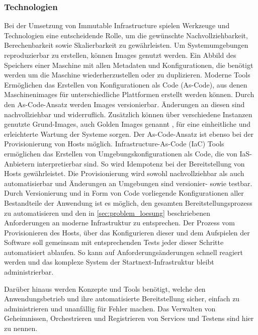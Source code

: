 \documentclass[11pt]{scrartcl}
\begin{document}
\subsubsection{Technologien} 
Bei der Umsetzung von Immutable Infrastructure spielen Werkzeuge und Technologien eine entscheidende Rolle, um die gewünschte Nachvollziehbarkeit, Berechenbarkeit sowie Skalierbarkeit zu gewährleisten. \newline 
Um Systemumgebungen reproduzierbar zu erstellen, können Images genutzt werden. Ein Abbild des Speichers einer Maschine mit allen Metadaten und Konfigurationen, die benötigt werden um die Maschine wiederherzustellen oder zu duplizieren. Moderne Tools Ermöglichen das Erstellen von Konfigurationen als Code (As-Code), aus denen Maschinenimages für unterschiedliche Plattformen erstellt werden können. Durch den \glqq As-Code\grqq{}-Ansatz werden Images versionierbar. Änderungen an diesen sind nachvollziehbar und widerruflich. Zusätzlich können über verschiedene Instanzen genutzte Grund-Images, auch Golden Images genannt \cite{GoldenImage:2018}, für eine einheitliche und erleichterte Wartung der Systeme sorgen. 
\newline
Der \glqq As-Code\grqq{}-Ansatz ist ebenso bei der Provisionierung von Hosts möglich. Infrastructure-As-Code (IaC) Tools ermöglichen das Erstellen von Umgebungskonfigurationen als Code, die von IaS-Anbietern interpretierbar sind. So wird Idempotenz bei der Bereitstellung von Hosts gewährleistet. Die Provisionierung wird sowohl nachvollziehbar als auch automatisierbar und Änderungen an Umgebungen sind versionier- sowie testbar.
Durch Versionierung und in Form von Code vorliegende Konfigurationen aller Bestandteile der Anwendung ist es möglich, den gesamten Bereitstellungsprozess zu automatisieren und den in \cref{sec:problem_loesung} beschriebenen Anforderungen an moderne Infrastruktur zu entsprechen. Der Prozess vom Provisionieren des Hosts, über das Konfigurieren dieser und dem Aufspielen der Software soll gemeinsam mit entsprechenden Tests jeder dieser Schritte automatisiert ablaufen. So kann auf Anforderungsänderungen schnell reagiert werden und das komplexe System der Startnext-Infrastruktur bleibt administrierbar.

Darüber hinaus werden Konzepte und Tools benötigt, welche den Anwendungsbetrieb und ihre automatisierte Bereitstellung sicher, einfach zu administrieren und unanfällig für Fehler machen. Das Verwalten von Geheimnissen, Orchestrieren und Registrieren von Services und Testens sind hier zu nennen.
\end{document}
